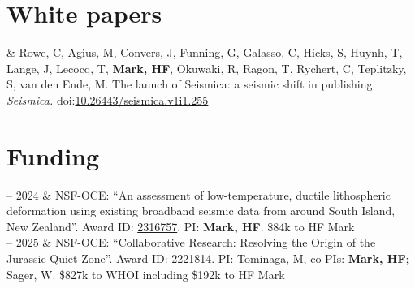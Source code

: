 \documentclass[10pt, letterpaper]{article}
\newcommand{\LastName}{Mark}
\newcommand{\Initials}{HF}  %
\newcommand{\Me}{\textbf{\LastName, \Initials}}  %
\newcommand{\danl}{Lizarralde, D}
\newcommand{\Doug}{Wiens, DA}
\newcommand{\Masako}{Tominaga, M}
\newcommand{\WSage}{Sager, W}
\newcommand{\CRowe}{Rowe, C}
\newcommand{\MAgi}{Agius, M}
\newcommand{\JConv}{Convers, J}
\newcommand{\GFun}{Funning, G}
\newcommand{\CGal}{Galasso, C}
\newcommand{\SHic}{Hicks, S}
\newcommand{\THuy}{Huynh, T}
\newcommand{\JLan}{Lange, J}
\newcommand{\TLec}{Lecocq, T}
\newcommand{\ROku}{Okuwaki, R}
\newcommand{\Thea}{Ragon, T}
\newcommand{\CRyc}{Rychert, C}
\newcommand{\STep}{Teplitzky, S}
\newcommand{\MvdE}{van den Ende, M}
\newcommand{\DOI}[1]{doi:\href{https://doi.org/#1}{#1}}
\newcommand{\Duration}[2]{\fontsize{9pt}{0}\selectfont #1 -- #2}
\newcommand{\Year}[1]{\fontsize{9pt}{0}\selectfont #1}
\begin{document}
%


\section{White papers}

\begin{EntriesTable}
\Year{2022}  &
  \CRowe, \MAgi, \JConv, \GFun, \CGal, \SHic, \THuy, \JLan, \TLec, \Me, \ROku, \Thea, \CRyc, \STep, \MvdE. 
  The launch of Seismica: a seismic shift in publishing. 
  \emph{Seismica.}
  \DOI{10.26443/seismica.v1i1.255}
\end{EntriesTable}


\section{Funding}

\begin{EntriesTable}
  \Duration{2023}{2024}  &
  NSF-OCE: ``An assessment of low-temperature, ductile lithospheric deformation using existing broadband seismic data from around South Island, New Zealand''. \newline
  Award ID: \href{https://www.nsf.gov/awardsearch/showAward?AWD_ID=2316757}{2316757}.
  PI: \Me. \newline
  \small \$84k to HF Mark
  \\
  \Duration{2023}{2025}  &
  NSF-OCE: ``Collaborative Research: Resolving the Origin of the Jurassic Quiet Zone''. \newline
  Award ID: \href{https://www.nsf.gov/awardsearch/showAward?AWD_ID=2221814}{2221814}.
  PI: \Masako, co-PIs: \Me; \WSage. \newline
  \small \$827k to WHOI including \$192k to HF Mark
\end{EntriesTable}
\end{document}
